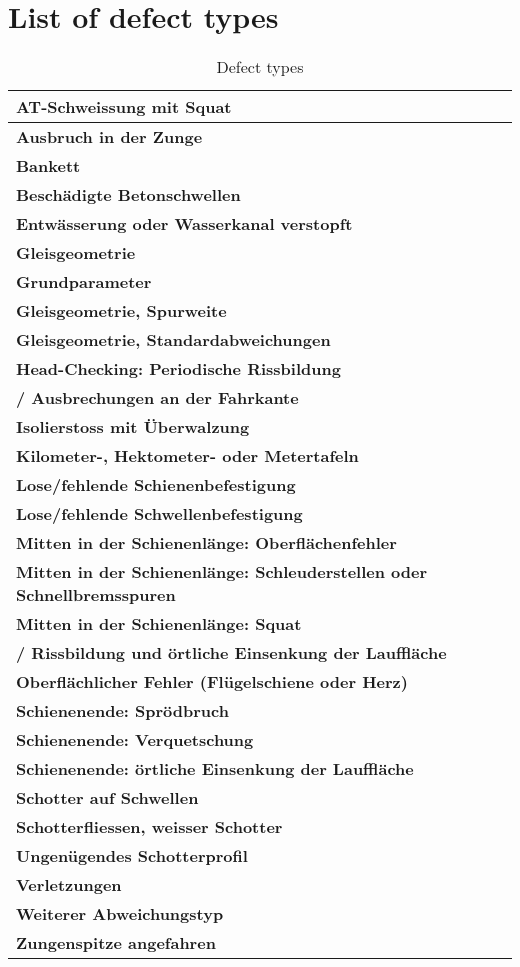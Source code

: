 \section{List of defect types}
\label{app:deftyp}
\begin{table}[H]
	\centering
	\begin{tabular}{|l|} \hline
		\textbf{AT-Schweissung mit Squat}\\ \hline
		\textbf{Ausbruch in der Zunge} \\ \hline
		\textbf{Bankett}\\ \hline
		\textbf{Beschädigte Betonschwellen} \\ \hline 
		\textbf{Entwässerung oder Wasserkanal verstopft}\\ \hline
		\textbf{Gleisgeometrie} \\ \hline
		\textbf{Grundparameter}\\ \hline
		\textbf{Gleisgeometrie, Spurweite} \\ \hline
		\textbf{Gleisgeometrie, Standardabweichungen}\\ \hline
		\textbf{Head-Checking:  Periodische Rissbildung} \\
		\textbf{/ Ausbrechungen an der Fahrkante} \\ \hline 
		\textbf{Isolierstoss mit Überwalzung}\\ \hline
		\textbf{Kilometer-, Hektometer- oder Metertafeln} \\ \hline
		\textbf{Lose/fehlende Schienenbefestigung}\\ \hline
		\textbf{Lose/fehlende Schwellenbefestigung}\\ \hline
		\textbf{Mitten in der Schienenlänge: Oberflächenfehler}\\ \hline
		\textbf{Mitten in der Schienenlänge: Schleuderstellen oder Schnellbremsspuren}\\ \hline
		\textbf{Mitten in der Schienenlänge: Squat} \\
		\textbf{/ Rissbildung und örtliche Einsenkung der Lauffläche}\\ \hline
		\textbf{Oberflächlicher Fehler (Flügelschiene oder Herz)}\\ \hline
		\textbf{Schienenende: Sprödbruch}\\ \hline
		\textbf{Schienenende: Verquetschung}\\ \hline
		\textbf{Schienenende: örtliche Einsenkung der Lauffläche}\\ \hline
		\textbf{Schotter auf Schwellen}\\ \hline
		\textbf{Schotterfliessen, weisser Schotter}\\ \hline
		\textbf{Ungenügendes Schotterprofil}\\ \hline
		\textbf{Verletzungen}\\ \hline
		\textbf{Weiterer Abweichungstyp}\\ \hline
		\textbf{Zungenspitze angefahren}\\ \hline
	\end{tabular}
	\caption{Defect types}
\end{table}

